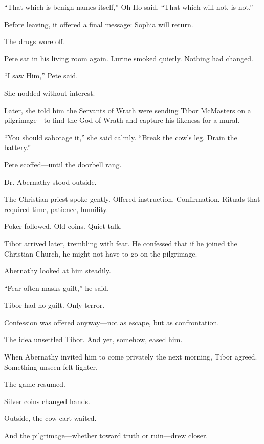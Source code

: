 “That which is benign names itself,” Oh Ho said. “That which will not, is not.”

Before leaving, it offered a final message: Sophia will return.

The drugs wore off.

Pete sat in his living room again. Lurine smoked quietly. Nothing had changed.

“I saw Him,” Pete said.

She nodded without interest.

Later, she told him the Servants of Wrath were sending Tibor McMasters on a pilgrimage—to find the God of Wrath and capture his likeness for a mural.

“You should sabotage it,” she said calmly. “Break the cow’s leg. Drain the battery.”

Pete scoffed—until the doorbell rang.

Dr. Abernathy stood outside.

The Christian priest spoke gently. Offered instruction. Confirmation. Rituals that required time, patience, humility.

Poker followed. Old coins. Quiet talk.

Tibor arrived later, trembling with fear. He confessed that if he joined the Christian Church, he might not have to go on the pilgrimage.

Abernathy looked at him steadily.

“Fear often masks guilt,” he said.

Tibor had no guilt. Only terror.

Confession was offered anyway—not as escape, but as confrontation.

The idea unsettled Tibor. And yet, somehow, eased him.

When Abernathy invited him to come privately the next morning, Tibor agreed. Something unseen felt lighter.

The game resumed.

Silver coins changed hands.

Outside, the cow-cart waited.

And the pilgrimage—whether toward truth or ruin—drew closer.

